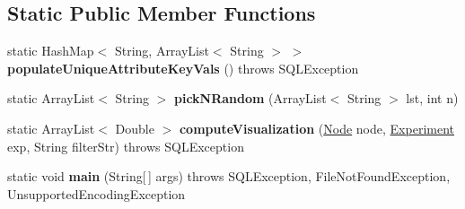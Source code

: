 \subsection*{Static Public Member Functions}
\begin{DoxyCompactItemize}
\item 
\mbox{\label{classedu_1_1uiuc_1_1viz_1_1algorithms_1_1_experiment_a69de19cb0074c2698f2b5e56c25623c2}} 
static Hash\+Map$<$ String, Array\+List$<$ String $>$ $>$ {\bfseries populate\+Unique\+Attribute\+Key\+Vals} ()  throws S\+Q\+L\+Exception
\item 
\mbox{\label{classedu_1_1uiuc_1_1viz_1_1algorithms_1_1_experiment_a792de825e0bca5998c12a2fa5c22b42e}} 
static Array\+List$<$ String $>$ {\bfseries pick\+N\+Random} (Array\+List$<$ String $>$ lst, int n)
\item 
\mbox{\label{classedu_1_1uiuc_1_1viz_1_1algorithms_1_1_experiment_af39f5f7846bfe138a1f29b48ac8d31ae}} 
static Array\+List$<$ Double $>$ {\bfseries compute\+Visualization} (\mbox{\hyperlink{classedu_1_1uiuc_1_1viz_1_1lattice_1_1_node}{Node}} node, \mbox{\hyperlink{classedu_1_1uiuc_1_1viz_1_1algorithms_1_1_experiment}{Experiment}} exp, String filter\+Str)  throws S\+Q\+L\+Exception 
\item 
\mbox{\label{classedu_1_1uiuc_1_1viz_1_1algorithms_1_1_experiment_aeec9088d60c7c47fa8d8430d6412943c}} 
static void {\bfseries main} (String\mbox{[}$\,$\mbox{]} args)  throws S\+Q\+L\+Exception, File\+Not\+Found\+Exception, Unsupported\+Encoding\+Exception  	
\end{DoxyCompactItemize}
